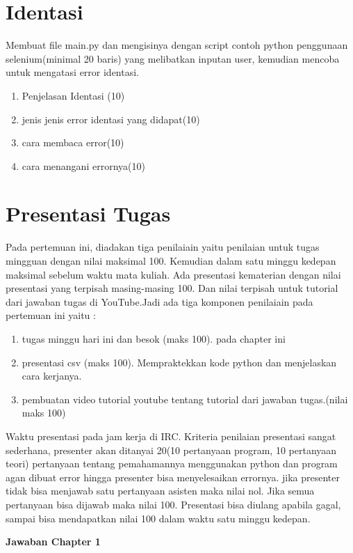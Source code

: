 \section{Identasi}
Membuat file main.py dan mengisinya dengan script contoh python penggunaan selenium(minimal 20 baris) yang melibatkan inputan user, kemudian mencoba untuk mengatasi error identasi.
\begin{enumerate}
	\item
Penjelasan Identasi (10)
	\item
jenis jenis error identasi yang didapat(10)
\item
cara membaca error(10)
\item 
cara menangani errornya(10)
\end{enumerate}

\section{Presentasi Tugas}
Pada pertemuan ini, diadakan tiga penilaiain yaitu penilaian untuk tugas mingguan dengan nilai maksimal 100. Kemudian dalam satu minggu kedepan maksimal sebelum waktu mata kuliah. Ada presentasi kematerian dengan nilai presentasi yang terpisah masing-masing 100. Dan nilai terpisah untuk tutorial dari jawaban tugas di YouTube.Jadi ada tiga komponen penilaiain pada pertemuan ini yaitu :
\begin{enumerate}
	\item tugas minggu hari ini dan besok (maks 100). pada chapter ini
	\item presentasi csv (maks 100). Mempraktekkan kode python dan menjelaskan cara kerjanya.
	\item pembuatan video tutorial youtube tentang tutorial dari jawaban tugas.(nilai maks 100)
\end{enumerate}
Waktu presentasi pada jam kerja di IRC. Kriteria penilaian presentasi sangat sederhana, presenter akan ditanyai 20(10 pertanyaan program, 10 pertanyaan teori) pertanyaan tentang pemahamannya menggunakan python dan program agan dibuat error hingga presenter bisa menyelesaikan errornya. jika presenter tidak bisa menjawab satu pertanyaan asisten maka nilai nol. Jika semua pertanyaan bisa dijawab maka nilai 100. Presentasi bisa diulang apabila gagal, sampai bisa mendapatkan nilai 100 dalam waktu satu minggu kedepan.
\item\textbf{Jawaban Chapter 1}
